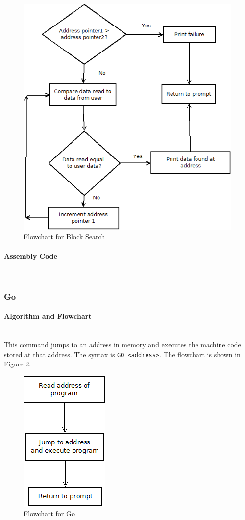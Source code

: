 \documentclass[12pt]{article}
\begin{document}
\begin{figure}[H]
\centering
\includegraphics[width=0.7\linewidth]{BSearch}
\caption{Flowchart for Block Search}
\label{fig:BSearch}
\end{figure}
			\paragraph{Assembly Code}~\\				
			
			\subsubsection{Go}
			
			\paragraph{Algorithm and Flowchart}~\\
			This command jumps to an address in memory and executes the machine code stored at that address. The syntax is \texttt{GO <address>}. The flowchart is shown in Figure \ref{fig:Go}.
			
			
\begin{figure}[H]
\centering
\includegraphics[width=0.2\linewidth]{Go}
\caption{Flowchart for Go}
\label{fig:Go}
\end{figure}
\end{document}
